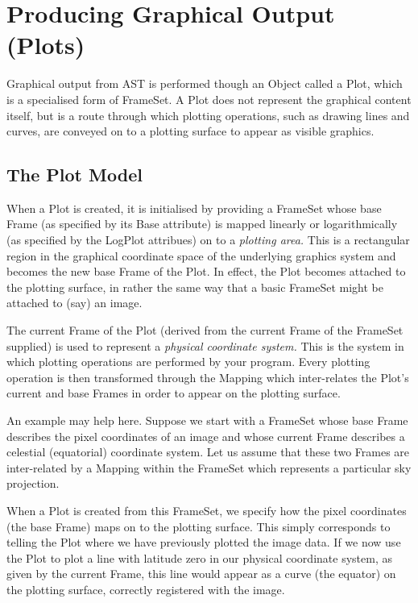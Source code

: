 \documentclass[twoside,11pt]{article}
\begin{document}
\cleardoublepage
\section{\label{ss:plots}Producing Graphical Output (Plots)}

Graphical output from AST is performed though an Object called a Plot,
which is a specialised form of FrameSet. A Plot does not represent the
graphical content itself, but is a route through which plotting
operations, such as drawing lines and curves, are conveyed on to a
plotting surface to appear as visible graphics.

\subsection{The Plot Model}

When a Plot is created, it is initialised by providing a FrameSet whose
base Frame (as specified by its Base attribute) is mapped linearly or
logarithmically (as specified by the LogPlot attribues) on to a
{\em{plotting area.}} This is a rectangular region in the graphical
coordinate space of the underlying graphics system and becomes the new
base Frame of the Plot. In effect, the Plot becomes attached to the
plotting surface, in rather the same way that a basic FrameSet might be
attached to (say) an image.

The current Frame of the Plot (derived from the current Frame of the
FrameSet supplied) is used to represent a {\em{physical coordinate
system.}} This is the system in which plotting operations are
performed by your program.  Every plotting operation is then
transformed through the Mapping which inter-relates the Plot's current
and base Frames in order to appear on the plotting surface.

An example may help here. Suppose we start with a FrameSet whose base
Frame describes the pixel coordinates of an image and whose current
Frame describes a celestial (equatorial) coordinate system. Let us
assume that these two Frames are inter-related by a Mapping within the
FrameSet which represents a particular sky projection.

When a Plot is created from this FrameSet, we specify how the pixel
coordinates (the base Frame) maps on to the plotting surface. This
simply corresponds to telling the Plot where we have previously
plotted the image data. If we now use the Plot to plot a line with
latitude zero in our physical coordinate system, as given by the
current Frame, this line would appear as a curve (the equator) on the
plotting surface, correctly registered with the image.
\end{document}
